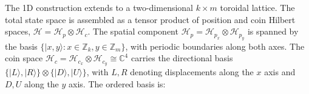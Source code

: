 The 1D construction extends to a two-dimensional $k \times m$
toroidal lattice. The total state space is assembled as a tensor
product of position and coin Hilbert spaces,
$\mathcal{H} = \mathcal{H}_p \otimes \mathcal{H}_c$. The spatial
component $\mathcal{H}_p = \mathcal{H}_{p_x} \otimes
\mathcal{H}_{p_y}$ is spanned by the basis
$\{|x, y\rangle : x \in \mathbb{Z}_k, y \in \mathbb{Z}_m\}$, with
periodic boundaries along both axes. The coin space
$\mathcal{H}_c = \mathcal{H}_{c_x} \otimes \mathcal{H}_{c_y}
\cong \mathbb{C}^4$ carries the directional basis
$\{|L\rangle, |R\rangle\} \otimes \{|D\rangle, |U\rangle\}$, with
$L, R$ denoting displacements along the $x$ axis and $D, U$ along
the $y$ axis. The ordered basis is:
